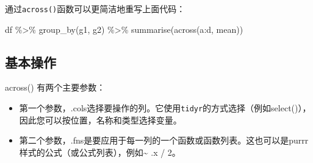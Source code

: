 \documentclass[
]{book}
\newenvironment{Shaded}{\begin{snugshade}}{\end{snugshade}}
\newcommand{\FunctionTok}[1]{\textcolor[rgb]{0.00,0.00,0.00}{#1}}
\newcommand{\NormalTok}[1]{#1}
\newcommand{\SpecialCharTok}[1]{\textcolor[rgb]{0.00,0.00,0.00}{#1}}
\begin{document}
通过\texttt{across()}函数可以更简洁地重写上面代码：

\begin{Shaded}
\begin{Highlighting}[]
\NormalTok{df }\SpecialCharTok{\%\textgreater{}\%} 
  \FunctionTok{group\_by}\NormalTok{(g1, g2) }\SpecialCharTok{\%\textgreater{}\%} 
  \FunctionTok{summarise}\NormalTok{(}\FunctionTok{across}\NormalTok{(a}\SpecialCharTok{:}\NormalTok{d, mean))}
\end{Highlighting}
\end{Shaded}

\hypertarget{ux57faux672cux64cdux4f5c}{%
\subsection{基本操作}\label{ux57faux672cux64cdux4f5c}}

across() 有两个主要参数：

\begin{itemize}
\item
  第一个参数，.cols选择要操作的列。它使用\texttt{tidyr}的方式选择（例如select()），因此您可以按位置，名称和类型选择变量。
\item
  第二个参数，.fns是要应用于每一列的一个函数或函数列表。这也可以是purrr样式的公式（或公式列表），例如\textasciitilde{} .x / 2。
\end{itemize}
\end{document}
